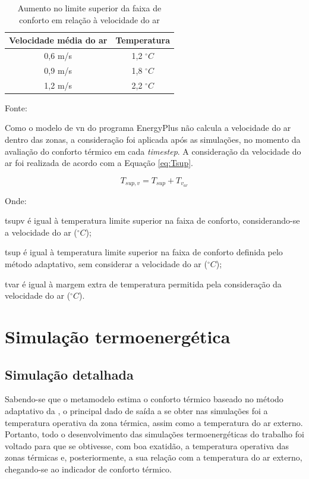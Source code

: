 \documentclass[brazil,hardcopy,openany]{ufscthesis} %
\newcommand{\source}[1]{\small \caption*{Fonte: {#1}} } %
\begin{document}
\begin{table}[h]
	\centering
	\caption{Aumento no limite superior da faixa de conforto em relação à velocidade do ar}
	\label{table:var}
	\begin{tabular}{|c |c |}
		\hline
		\textbf{Velocidade média do ar} & \textbf{Temperatura} \\
		\hline
		0,6 m/s & 1,2 $^{\circ}C$ \\
		\hline
		0,9 m/s & 1,8 $^{\circ}C$ \\
		\hline
		1,2 m/s & 2,2 $^{\circ}C$ \\
		\hline 
	\end{tabular}
	\source{}
\end{table}

Como o modelo de \acrlong{vn} do programa EnergyPlus não calcula a velocidade do ar dentro das zonas, a consideração foi aplicada após as simulações, no momento da avaliação do conforto térmico em cada \textit{timestep}. A consideração da velocidade do ar foi realizada de acordo com a Equação \ref{eq:Tsup}.

\begin{equation}
\label{eq:Tsup}
T_{sup,v} = T_{sup} + T_{v_{ar}}
\end{equation}

Onde:

\gls{tsupv} é igual à temperatura limite superior na faixa de conforto, considerando-se a velocidade do ar ($^{\circ}C$);

\gls{tsup} é igual à temperatura limite superior na faixa de conforto definida pelo método adaptativo, sem considerar a velocidade do ar ($^{\circ}C$);

\gls{tvar} é igual à margem extra de temperatura permitida pela consideração da velocidade do ar ($^{\circ}C$).
\\

\section{Simulação termoenergética}

\subsection{Simulação detalhada}

Sabendo-se que o metamodelo estima o conforto térmico baseado no método adaptativo da , o principal dado de saída a se obter nas simulações foi a temperatura operativa da zona térmica, assim como a temperatura do ar externo. Portanto, todo o desenvolvimento das simulações termoenergéticas do trabalho foi voltado para que se obtivesse, com boa exatidão, a temperatura operativa das zonas térmicas e, posteriormente, a sua relação com a temperatura do ar externo, chegando-se ao indicador de conforto térmico.
\end{document}

